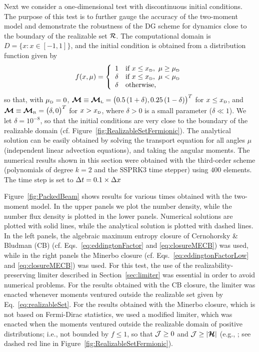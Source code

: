Next we consider a one-dimensional test with discontinuous initial conditions.  
The purpose of this test is to further gauge the accuracy of the two-moment model and demonstrate the robustness of the DG scheme for dynamics close to the boundary of the realizable set $\mathcal{R}$.  
The computational domain is $D=\{x:x\in[-1,1]\}$, and the initial condition is obtained from a distribution function given by
\begin{equation}
  f(x,\mu)
  =\left\{
  \begin{array}{cl}
    1        & \text{if} ~ x\le x_{\mbox{\tiny D}}, ~ \mu\ge\mu_{\mbox{\tiny D}} \\
    \delta & \text{if} ~ x\le x_{\mbox{\tiny D}}, ~ \mu<   \mu_{\mbox{\tiny D}} \\
    \delta & \text{otherwise},
  \end{array}
  \right.
\end{equation}
so that, with $\mu_{\mbox{\tiny D}}=0$, $\boldsymbol{\mathcal{M}}\equiv\boldsymbol{\mathcal{M}}_{\mbox{\tiny L}}=\big(0.5\,(1+\delta),0.25\,(1-\delta)\big)^{T}$ for $x\le x_{\mbox{\tiny D}}$, and $\boldsymbol{\mathcal{M}}\equiv\boldsymbol{\mathcal{M}}_{\mbox{\tiny R}}=\big(\delta,0\big)^{T}$ for $x> x_{\mbox{\tiny D}}$, where $\delta>0$ is a small parameter ($\delta\ll1$).  
We let $\delta=10^{-8}$, so that the initial conditions are very close to the boundary of the realizable domain (cf. Figure~\ref{fig:RealizableSetFermionic}).  
The analytical solution can be easily obtained by solving the transport equation for all angles $\mu$ (independent linear advection equations), and taking the angular moments.  
The numerical results shown in this section were obtained with the third-order scheme (polynomials of degree $k=2$ and the SSPRK3 time stepper) using $400$ elements.  
The time step is set to $\Delta t=0.1\times\Delta x$

Figure~\ref{fig:PackedBeam} shows results for various times obtained with the two-moment model.  
In the upper panels we plot the number density, while the number flux density is plotted in the lower panels.  
Numerical solutions are plotted with solid lines, while the analytical solution is plotted with dashed lines.  
In the left panels, the algebraic maximum entropy closure of Cernohorsky \& Bludman (CB) \cite{cernohorskyBludman_1994} (cf. Eqs.~\eqref{eq:eddingtonFactor} and \eqref{eq:closureMECB}) was used, while in the right panels the Minerbo closure (cf. Eqs.~\eqref{eq:eddingtonFactorLow} and \eqref{eq:closureMECB}) was used.  
For this test, the use of the realizability-preserving limiter described in Section~\ref{sec:limiter} was essential in order to avoid numerical problems.  
For the results obtained with the CB closure, the limiter was enacted whenever moments ventured outside the realizable set given by Eq.~\eqref{eq:realizableSet}.  
For the results obtained with the Minerbo closure, which is not based on Fermi-Dirac statistics, we used a modified limiter, which was enacted when the moments ventured outside the realizable domain of positive distributions; i.e., not bounded by $f\le1$, so that $\mathcal{J}\ge0$ and $\mathcal{J}\ge|\boldsymbol{\mathcal{H}}|$ (e.g., \cite{levermore_1984}; see dashed red line in Figure~\ref{fig:RealizableSetFermionic}).  

